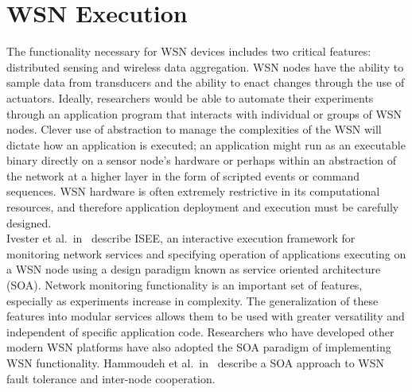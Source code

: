 \section{WSN Execution}
The functionality necessary for WSN devices includes two critical features: distributed sensing and wireless data aggregation. WSN nodes have the ability to sample data from transducers and the ability to enact changes through the use of actuators. Ideally, researchers would be able to automate their experiments through an application program that interacts with individual or groups of WSN nodes. Clever use of abstraction to manage the complexities of the WSN will dictate how an application is executed; an application might run as an executable binary directly on a sensor node's hardware or perhaps within an abstraction of the network at a higher layer in the form of scripted events or command sequences. WSN hardware is often extremely restrictive in its computational resources, and therefore application deployment and execution must be carefully designed.\\ 

Ivester et al.\ in~\cite{Ivester} describe ISEE, an interactive execution framework for monitoring network services and specifying operation of applications executing on a WSN node using a design paradigm known as service oriented architecture (SOA). Network monitoring functionality is an important set of features, especially as experiments increase in complexity. The generalization of these features into modular services allows them to be used with greater versatility and independent of specific application code. Researchers who have developed other modern WSN platforms have also adopted the SOA paradigm of implementing WSN functionality. Hammoudeh et al.\ in~\cite{Hammoudeh} describe a SOA approach to WSN fault tolerance and inter-node cooperation.\\

